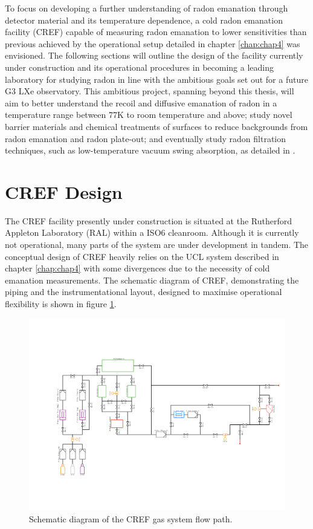 To focus on developing a further understanding of radon emanation through detector material and its temperature dependence, a cold radon emanation facility (CREF) capable of measuring radon emanation to lower sensitivities than previous achieved by the operational setup detailed in chapter \ref{chap:chap4} was envisioned. The following sections will outline the design of the facility currently under construction and its operational procedures in becoming a leading laboratory for studying radon in line with the ambitious goals set out for a future G3 LXe observatory. This ambitious project, spanning beyond this thesis, will aim to better understand the recoil and diffusive emanation of radon in a temperature range between 77K to room temperature and above; study novel barrier materials and chemical treatments of surfaces to reduce backgrounds from radon emanation and radon plate-out; and eventually study radon filtration techniques, such as low-temperature vacuum swing absorption, as detailed in \cite{Street:2017bde}. 


\section{CREF Design}
\label{sec:radon_design}

The CREF facility presently under construction is situated at the 
Rutherford Appleton Laboratory (RAL) within a ISO6 cleanroom. Although it is currently not operational, many parts of the system are under development in tandem. The conceptual design of CREF heavily relies on the UCL system described in chapter \ref{chap:chap4} with some divergences due to the necessity of cold emanation measurements. The schematic diagram of CREF, demonstrating the piping and the instrumentational layout, designed to maximise operational flexibility is shown in figure \ref{fig:cref_pid}.
%
\begin{figure}[h!]
    \centering
    \includegraphics[scale=0.5]{Chapter_7/Figures/cold_radon_pid.pdf}
    \caption[Schematic diagram of the CREF gas system flow path.]%
    {Schematic diagram of the CREF gas system flow path.}
    \label{fig:cref_pid}
\end{figure}
%

